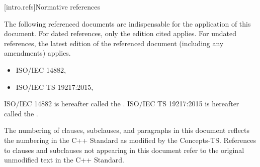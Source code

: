 
[intro.refs]{Normative references}

\pnum
The following referenced documents are indispensable for the application of this
document. For dated references, only the edition cited applies. For undated
references, the latest edition of the referenced document (including any
amendments) applies.

\begin{itemize}
\item ISO/IEC 14882, 
\item ISO/IEC TS 19217:2015, 
\end{itemize}

\pnum
ISO/IEC 14882 is hereafter called the . ISO/IEC TS 19217:2015 is hereafter called the .


\pnum
The numbering of clauses, subclauses, and paragraphs in this document reflects
the numbering in the C++ Standard as modified by the Concepts-TS.  References to clauses and subclauses not
appearing in this document refer to the original unmodified text
in the C++ Standard.

